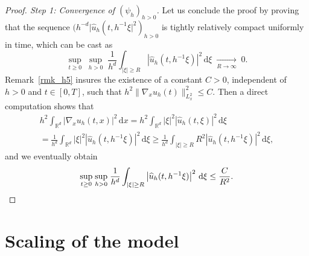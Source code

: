 \documentclass[JEP,XML,SOM,NoEqCountersInSection,NoFloatCountersInSection,Unicode,published]{cedram}
\let\hat\oldhat
\theoremstyle{definition}
\let\hat\widehat
\newcommand{\R}{\mathbb{R}}
\newcommand{\ud}{\, {\mathrm{d}}}
\begin{document}
\begin{proof}[Proof. Step 1: Convergence of $(\psi_{h})_{h>0}$]
Let us conclude the proof by proving that the sequence $(h^{-d}|\hat{u}_{h}(t,h^{-1}\xi|^{2})_{h>0}$ is tightly relatively compact uniformly in time, which can be cast as
\[
\underset{t\geq 0}{\sup}\;\underset{h>0}{\sup}\;\frac{1}{h^{d}}\int_{|\xi|\geq R}\left|\hat{u}_{h}(t,h^{-1}\xi)\right|^{2}\ud\xi\;\underset{R\to \infty}{\to}\;0.
\]
Remark~\ref{rmk_h5} insures the existence of a constant $C>0$, independent of $h>0$ and $t\in[0,T]$, such that $h^{2}\|\nabla_{x}u_{h}(t)\|_{L_{x}^{2}}^{2}\leq C$. Then a direct computation shows that
\begin{multline*}
h^{2}\int_{\R^{d}}|\nabla_{x}u_{h}(t,x)|^{2}\ud x=h^{2}\int_{\R^{d}}|\xi|^{2}\left|\hat{u}_{h}(t,\xi)\right|^{2}\ud\xi\\
=\frac{1}{h^{d}}\int_{\R^{d}}|\xi|^{2}\left|\hat{u}_{h}(t,h^{-1}\xi)\right|^{2}\ud\xi\geq\frac{1}{h^{d}}\int_{|\xi|\geq R}R^{2}\left|\hat{u}_{h}(t,h^{-1}\xi)\right|^{2}\ud\xi,
\end{multline*}
and we eventually obtain
\[
\underset{t\geq 0}{\sup}\;\underset{h>0}{\sup}\;\frac{1}{h^{d}}\int_{|\xi|\geq R}\left|\hat{u}_{h}(t,h^{-1}\xi)\right|^{2}\ud\xi\leq \frac{C}{R^{2}}.\qedhere
\]
\end{proof}

\section{Scaling of the model}\label{adim}
\end{document}
